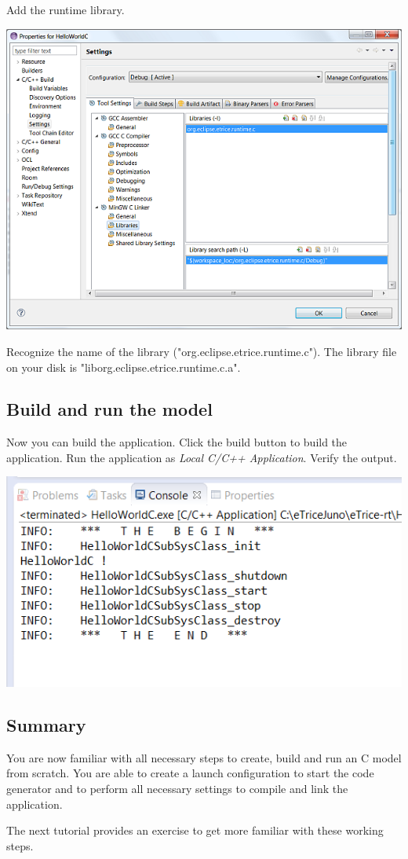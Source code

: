 Add the runtime library.

\includegraphics{images/016-HelloWorldC15.png}

Recognize the name of the library ("org.eclipse.etrice.runtime.c"). The library file on your disk is 
"liborg.eclipse.etrice.runtime.c.a". 

\subsection{Build and run the model}

Now you can build the application. Click the build button to build the application.
Run the application as \textit{Local C/C++ Application}.
Verify the output.

\includegraphics{images/016-HelloWorldC16.png}

\subsection{Summary}

You are now familiar with all necessary steps to create, build and run an \eTrice{} C model from scratch. You 
are able to create a launch configuration to start the code generator and to perform all necessary 
settings to compile and link the application.  

The next tutorial provides an exercise to get more familiar with these working steps.
